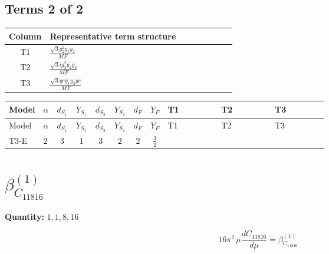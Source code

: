 \documentclass[8pt]{article}
\begin{document}
\begin{landscape}
\subsection*{Terms 2 of 2}
\begin{center}
\begin{tabular}{@{}c >{\raggedright\arraybackslash}p{0.82\linewidth}@{}}
\toprule
Column & Representative term structure \\
\midrule
T1 & \(\displaystyle \frac{\sqrt{3} g_{2}^{2} \overline{y_{1}} \overline{y_{2}}}{MF}\) \\
\midrule
T2 & \(\displaystyle \frac{\sqrt{3} i g_{2}^{2} \overline{y_{1}} \overline{y_{2}}}{MF}\) \\
\midrule
T3 & \(\displaystyle \frac{\sqrt{3} ye \overline{y_{1}} \overline{y_{2}} \overline{ye}}{MF}\) \\
\midrule
\bottomrule
\end{tabular}
\end{center}
\smallskip
\tiny
\begin{longtable}{@{}llcccccc >{\raggedright\arraybackslash}p{0.21\linewidth} >{\raggedright\arraybackslash}p{0.21\linewidth} >{\raggedright\arraybackslash}p{0.21\linewidth}@{}}
\toprule
Model & $\alpha$ & $d_{S_1}$ & $Y_{S_1}$ & $d_{S_2}$ & $Y_{S_2}$ & $d_F$ & $Y_F$ & T1 & T2 & T3 \\
\midrule
\endfirsthead
\toprule
Model & $\alpha$ & $d_{S_1}$ & $Y_{S_1}$ & $d_{S_2}$ & $Y_{S_2}$ & $d_F$ & $Y_F$ & T1 & T2 & T3 \\
\midrule
\endhead
T3-E & $2$ & $3$ & $1$ & $3$ & $2$ & $2$ & $\frac{3}{2}$ & \scriptsize\adjustbox{max width=\linewidth}{$\begin{gathered} \frac{11 \sqrt{3} g_{2}^{2} \overline{y_{1}} \overline{y_{2}}}{8 MF}\end{gathered}$} & \scriptsize\adjustbox{max width=\linewidth}{$\begin{gathered} - \frac{\sqrt{3} i g_{2}^{2} \overline{y_{1}} \overline{y_{2}}}{6 MF}\end{gathered}$} & \scriptsize\adjustbox{max width=\linewidth}{$\begin{gathered} - \frac{\sqrt{3} ye \overline{y_{1}} \overline{y_{2}} \overline{ye}}{12 MF}\end{gathered}$} \\
\midrule
\bottomrule
\end{longtable}
\clearpage
\section*{$\beta_{C_{11816}}^{(1)}$}
\noindent\textbf{Quantity: }$\mathrm{1,1,8,16}$\par\smallskip
\[16\pi^2\,\mu\frac{d C_{11816}}{d\mu}=\beta_{C_{11816}}^{(1)}\]

\end{landscape}
\end{document}
